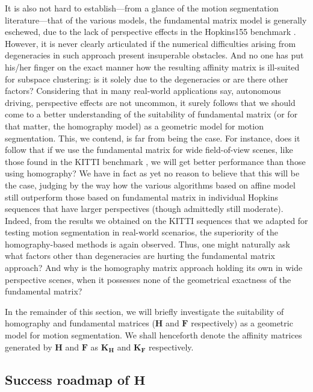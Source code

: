 \documentclass[10pt,twocolumn,letterpaper]{article}
\begin{document}
It is also not hard to establish---from a glance of the motion segmentation literature---that of the various models, the fundamental matrix model is generally eschewed, due to the lack of perspective effects in the Hopkins155 benchmark \cite{Tron2007}. However, it is never clearly articulated if the numerical difficulties arising from degeneracies in such approach present insuperable obstacles. And no one has put his/her finger on the exact manner how the resulting affinity matrix is ill-suited for subspace clustering: is it solely due to the degeneracies or are there other factors? Considering that in many real-world applications say, autonomous driving, perspective effects are not uncommon, it surely follows that we should come to a better understanding of the suitability of fundamental matrix (or for that matter, the homography model) as a geometric model for motion segmentation. This, we contend, is far from being the case. For instance, does it follow that if we use the fundamental matrix for wide field-of-view scenes, like those found in the KITTI benchmark \cite{Geiger2013IJRR}, we will get better performance than those using homography? We have in fact as yet no reason to believe that this will be the case, judging by the way how the various algorithms based on affine model still outperform those based on fundamental matrix in individual Hopkins sequences that have larger perspectives (though admittedly still moderate). Indeed, from the results we obtained on the KITTI sequences that we adapted for testing motion segmentation in real-world scenarios, the superiority of the homography-based methods is again observed. Thus, one might naturally ask what factors other than degeneracies are hurting the fundamental matrix approach? And why is the homography matrix approach holding its own in wide perspective scenes, when it possesses none of the geometrical exactness of the fundamental matrix? 

In the remainder of this section, we will briefly investigate the suitability of homography and fundamental matrices ($\mathbf{H}$ and $\mathbf{F}$ respectively) as a geometric model for motion segmentation. We shall henceforth denote the affinity matrices generated by $\mathbf{H}$ and $\mathbf{F}$ as $\mathbf{K_H}$ and $\mathbf{K_F}$ respectively.

\subsection{Success roadmap of $\mathbf{H}$}
\end{document}
